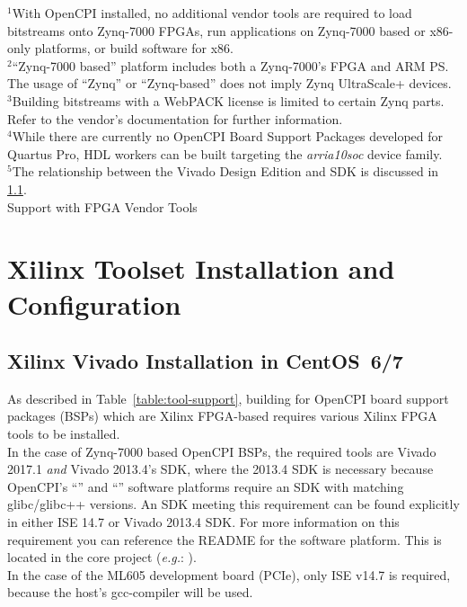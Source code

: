 \begin{flushleft}
\begin{landscape}
\begin{center}
\begin{table}[H]
		\footnotesize{$^1$With OpenCPI installed, no additional vendor tools are required to load bitstreams onto Zynq-7000 FPGAs, run applications on Zynq-7000 based or x86-only platforms, or build software for x86.}\\
		\footnotesize{$^2$``Zynq-7000 based'' platform includes both a Zynq-7000's FPGA and ARM PS. The usage of ``Zynq'' or ``Zynq-based'' does not imply Zynq UltraScale+ devices.}\\
		\footnotesize{$^3$Building bitstreams with a WebPACK license is limited to certain Zynq parts. Refer to the vendor's documentation for further information.}\\
		\footnotesize{$^4$While there are currently no OpenCPI Board Support Packages developed for Quartus Pro, HDL workers can be built targeting the \textit{arria10soc} device family.}\\
		\footnotesize{$^5$The relationship between the Vivado Design Edition and SDK is discussed in \ref{sec:viv_intro}.}\\
		\caption {Support with FPGA Vendor Tools}
		\label{table:tool-support} %
	\end{table}
\end{center}
\end{landscape}

\section{Xilinx Toolset Installation and Configuration}
\subsection{Xilinx Vivado Installation in CentOS~6/7}
\label{sec:viv_intro}
\begin{flushleft}
As described in Table~\ref{table:tool-support}, building for OpenCPI board support packages (BSPs) which are Xilinx FPGA-based requires various Xilinx FPGA tools to be installed. \\ \medskip
In the case of Zynq-7000 based OpenCPI BSPs, the required tools are Vivado 2017.1 \textit{and} Vivado 2013.4's SDK, where the 2013.4 SDK is necessary because OpenCPI's ``'' and ``'' software platforms require an SDK with matching glibc/glibc++ versions. An SDK meeting this requirement can be found explicitly in either ISE 14.7 or Vivado 2013.4 SDK. For more information on this requirement you can reference the README for the  software platform. This is located in the core project (\textit{e.g.}: ).\\ \medskip
In the case of the ML605 development board (PCIe), only ISE v14.7 is required, because the host's gcc-compiler will be used.


\end{flushleft}
\end{flushleft}
